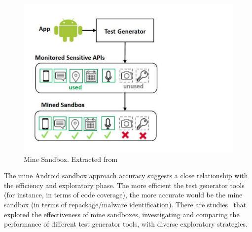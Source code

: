 \begin{figure}[ht]
\centering
\includegraphics[scale=0.30]{images/mineSandbox.pdf}
\caption{Mine Sandbox. Extracted from~\cite{DBLP:conf/wcre/BaoLL18}}
 \label{fig:mineSandbox}
\end{figure}

The mine Android sandbox approach accuracy suggests a close relationship with the efficiency and exploratory phase. The more efficient the test generator tools (for instance, in terms of code coverage), the more accurate would be the mine sandbox (in terms of repackage/malware identification). There are studies~\cite{DBLP:conf/wcre/BaoLL18,DBLP:conf/scam/CostaMCMVBC20} that explored the effectiveness of mine sandboxes, investigating and comparing the performance of different test generator tools, with diverse exploratory strategies.